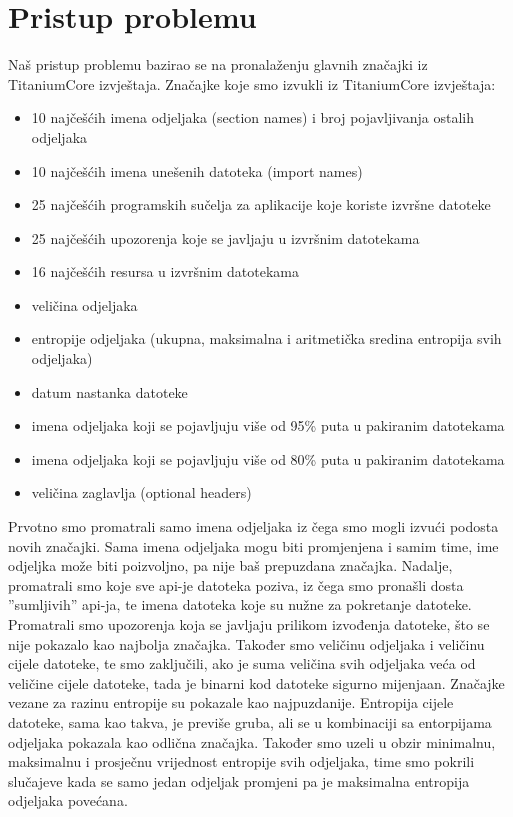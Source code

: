\documentclass[conference]{IEEEtran}
\begin{document}
\section{Pristup problemu}
Naš pristup problemu bazirao se na pronalaženju glavnih značajki iz TitaniumCore izvještaja.
Značajke koje smo izvukli iz TitaniumCore izvještaja:
\begin{itemize}
\item 10 najčešćih imena odjeljaka (section names) i broj pojavljivanja ostalih odjeljaka
\item 10 najčešćih imena unešenih datoteka (import names)
\item 25 najčešćih programskih sučelja za aplikacije koje koriste izvršne datoteke
\item 25 najčešćih upozorenja koje se javljaju u izvršnim datotekama
\item 16 najčešćih resursa u izvršnim datotekama
\item veličina odjeljaka
\item entropije odjeljaka (ukupna, maksimalna i aritmetička sredina entropija svih odjeljaka)\cite{b1}
\item datum nastanka datoteke
\item imena odjeljaka koji se pojavljuju više od 95\% puta u pakiranim datotekama
\item imena odjeljaka koji se pojavljuju više od 80\% puta u pakiranim datotekama
\item veličina zaglavlja (optional headers)
\end{itemize}
Prvotno smo promatrali samo imena odjeljaka iz čega smo mogli izvući podosta novih značajki. Sama imena odjeljaka mogu biti promjenjena i samim time, ime odjeljka može biti poizvoljno, pa nije baš prepuzdana značajka. Nadalje, promatrali smo koje sve api-je datoteka poziva, iz čega smo pronašli dosta ''sumljivih'' api-ja, te imena datoteka koje su nužne za pokretanje datoteke.  Promatrali smo upozorenja koja se javljaju prilikom izvođenja datoteke, što se nije pokazalo kao najbolja značajka. Također smo veličinu odjeljaka i veličinu cijele datoteke, te smo zaključili, ako je suma veličina svih odjeljaka veća od veličine cijele datoteke, tada je binarni kod datoteke sigurno mijenjaan. 
Značajke vezane za razinu entropije su pokazale kao najpuzdanije. Entropija cijele datoteke, sama kao takva, je previše gruba, ali se u kombinaciji sa entorpijama odjeljaka pokazala kao odlična značajka. Također smo uzeli u obzir minimalnu, maksimalnu i prosječnu vrijednost entropije svih odjeljaka, time smo pokrili slučajeve kada se samo jedan odjeljak promjeni pa je maksimalna entropija odjeljaka povećana.
\end{document}
